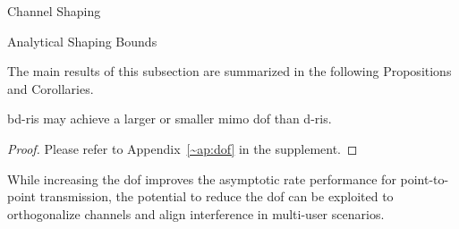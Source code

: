 \documentclass[journal]{IEEEtran}
\begin{document}
\begin{section}{Channel Shaping}
\begin{subsection}{Analytical Shaping Bounds}
\begin{definition}
		\end{definition}

		The main results of this subsection are summarized in the following Propositions and Corollaries.
		\begin{proposition}
			\label{pp:dof}
			\gls{bd}-\gls{ris} may achieve a larger or smaller \gls{mimo} \gls{dof} than \gls{d}-\gls{ris}.
		\end{proposition}
		\begin{proof}
			Please refer to Appendix~\ref{~ap:dof} in the supplement.
		\end{proof}

		While increasing the \gls{dof} improves the asymptotic rate performance for point-to-point transmission, the potential to reduce the \gls{dof} can be exploited to orthogonalize channels and align interference in multi-user scenarios.


\end{subsection}
\end{section}
\end{document}
